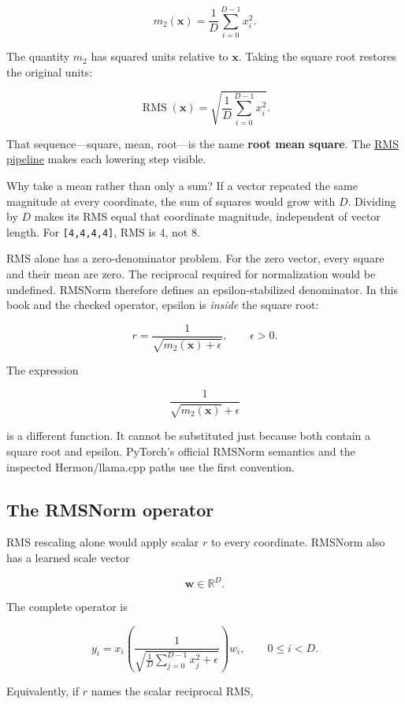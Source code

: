 \documentclass[
  10pt,
]{article}
\begin{document}
\[
m_2(\mathbf{x})=\frac{1}{D}\sum_{i=0}^{D-1}x_i^2.
\]

The quantity \(m_2\) has squared units relative to \(\mathbf{x}\).
Taking the square root restores the original units:

\[
\operatorname{RMS}(\mathbf{x})
=\sqrt{\frac{1}{D}\sum_{i=0}^{D-1}x_i^2}.
\]

That sequence---square, mean, root---is the name \textbf{root mean
square}. The
\href{https://github.com/hermonai/inside-the-llm-engine/blob/astra-visual-rewrite/diagrams/transformer/rms-calculation-pipeline.txt}{RMS
pipeline} makes each lowering step visible.

Why take a mean rather than only a sum? If a vector repeated the same
magnitude at every coordinate, the sum of squares would grow with \(D\).
Dividing by \(D\) makes its RMS equal that coordinate magnitude,
independent of vector length. For \texttt{{[}4,4,4,4{]}}, RMS is 4, not
8.

RMS alone has a zero-denominator problem. For the zero vector, every
square and their mean are zero. The reciprocal required for
normalization would be undefined. RMSNorm therefore defines an
epsilon-stabilized denominator. In this book and the checked operator,
epsilon is \emph{inside} the square root:

\[
r=\frac{1}{\sqrt{m_2(\mathbf{x})+\epsilon}},
\qquad \epsilon>0.
\]

The expression

\[
\frac{1}{\sqrt{m_2(\mathbf{x})}+\epsilon}
\]

is a different function. It cannot be substituted just because both
contain a square root and epsilon. PyTorch's official RMSNorm semantics
and the inspected Hermon/llama.cpp paths use the first convention.

\subsection{The RMSNorm operator}\label{the-rmsnorm-operator}

RMS rescaling alone would apply scalar \(r\) to every coordinate.
RMSNorm also has a learned scale vector

\[
\mathbf{w}\in\mathbb{R}^{D}.
\]

The complete operator is

\[
\boxed{
y_i=x_i
\left(
\frac{1}{\sqrt{\frac{1}{D}\sum_{j=0}^{D-1}x_j^2+\epsilon}}
\right)
w_i
},
\qquad 0\le i<D.
\]

Equivalently, if \(r\) names the scalar reciprocal RMS,
\end{document}
